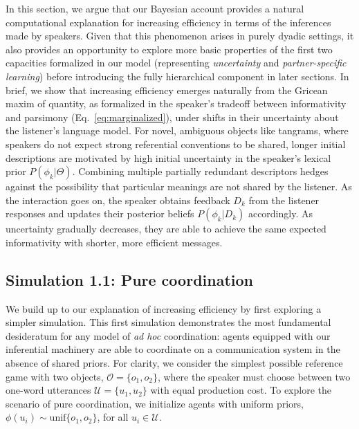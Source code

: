 In this section, we argue that our Bayesian account provides a natural computational explanation for increasing efficiency in terms of the inferences made by speakers.
Given that this phenomenon arises in purely dyadic settings, it also provides an opportunity to explore more basic properties of the first two capacities formalized in our model (representing \emph{uncertainty} and \emph{partner-specific learning}) before introducing the fully hierarchical component in later sections. 
In brief, we show that increasing efficiency emerges naturally from the Gricean maxim of quantity, as formalized in the speaker's tradeoff between informativity and parsimony (Eq.~\ref{eq:marginalized}), under shifts in their uncertainty about the listener's language model. 
For novel, ambiguous objects like tangrams, where speakers do not expect strong referential conventions to be shared, longer initial descriptions are motivated by high initial uncertainty in the speaker's lexical prior $P(\phi_k | \Theta)$. 
Combining multiple partially redundant descriptors hedges against the possibility that particular meanings are not shared by the listener.
As the interaction goes on, the speaker obtains feedback $D_k$ from the listener responses and updates their posterior beliefs $P(\phi_k | D_k)$ accordingly. 
As uncertainty gradually decreases, they are able to achieve the same expected informativity with shorter, more efficient messages. 

\subsection{Simulation 1.1: Pure coordination}


We build up to our explanation of increasing efficiency by first exploring a simpler simulation.
This first simulation demonstrates the most fundamental desideratum for any model of \emph{ad hoc} coordination: agents equipped with our inferential machinery are able to coordinate on a communication system in the absence of shared priors. 
For clarity, we consider the simplest possible reference game with two objects, $\mathcal{O} = \{o_1, o_2\}$, where the speaker must choose between two one-word utterances $\mathcal{U} = \{u_1, u_2\}$ with equal production cost. 
To explore the scenario of pure coordination, we initialize agents with uniform priors, $\phi(u_i) \sim \textrm{unif}\{o_1, o_2\}$, for all $u_i \in \mathcal{U}$.

